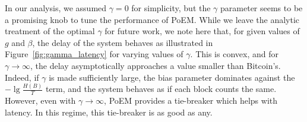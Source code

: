 In our analysis, we assumed $\gamma = 0$ for simplicity, but the $\gamma$ parameter
seems to be a promising knob to tune the performance of PoEM. While we leave
the
analytic treatment of the optimal $\gamma$ for future work, we note here that,
for given values of $g$ and $\beta$, the delay of the system behaves as illustrated
in Figure~\ref{fig:gamma_latency} for varying values of $\gamma$. This is convex, and for $\gamma \to \infty$,
the delay asymptotically approaches a value smaller than Bitcoin's. Indeed, if $\gamma$ is made sufficiently large, the bias
parameter dominates against the $-\lg\frac{H(B)}{T}$ term, and the system behaves
as if each block counts the same. However, even with $\gamma \to \infty$, PoEM provides a tie-breaker
which helps with latency. In this regime, this tie-breaker is as good as any.

